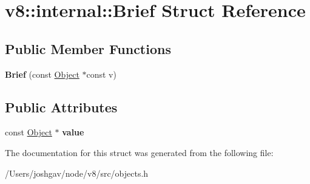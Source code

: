 \hypertarget{structv8_1_1internal_1_1_brief}{}\section{v8\+:\+:internal\+:\+:Brief Struct Reference}
\label{structv8_1_1internal_1_1_brief}
\subsection*{Public Member Functions}
\begin{DoxyCompactItemize}
\item 
{\bfseries Brief} (const \hyperlink{classv8_1_1internal_1_1_object}{Object} $\ast$const v)\hypertarget{structv8_1_1internal_1_1_brief_ad8c36e6895604d507dff45fbc0e48b6d}{}\label{structv8_1_1internal_1_1_brief_ad8c36e6895604d507dff45fbc0e48b6d}

\end{DoxyCompactItemize}
\subsection*{Public Attributes}
\begin{DoxyCompactItemize}
\item 
const \hyperlink{classv8_1_1internal_1_1_object}{Object} $\ast$ {\bfseries value}\hypertarget{structv8_1_1internal_1_1_brief_aa8fb3f951c2e4f16023e5bf8d4addc91}{}\label{structv8_1_1internal_1_1_brief_aa8fb3f951c2e4f16023e5bf8d4addc91}

\end{DoxyCompactItemize}


The documentation for this struct was generated from the following file\+:\begin{DoxyCompactItemize}
\item 
/\+Users/joshgav/node/v8/src/objects.\+h\end{DoxyCompactItemize}
